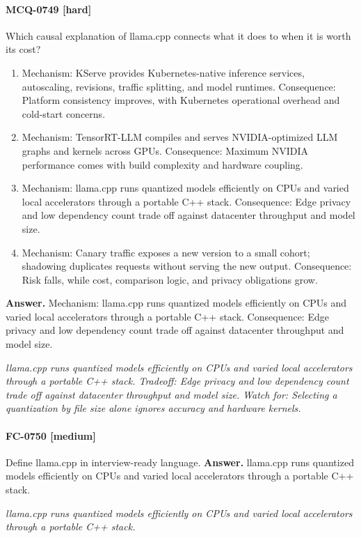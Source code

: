 \paragraph{MCQ-0749 [hard]} Which causal explanation of llama.cpp connects what it does to when it is worth its cost?
\begin{enumerate}[label=\Alph*.]
\item Mechanism: KServe provides Kubernetes-native inference services, autoscaling, revisions, traffic splitting, and model runtimes. Consequence: Platform consistency improves, with Kubernetes operational overhead and cold-start concerns.
\item Mechanism: TensorRT-LLM compiles and serves NVIDIA-optimized LLM graphs and kernels across GPUs. Consequence: Maximum NVIDIA performance comes with build complexity and hardware coupling.
\item Mechanism: llama.cpp runs quantized models efficiently on CPUs and varied local accelerators through a portable C++ stack. Consequence: Edge privacy and low dependency count trade off against datacenter throughput and model size.
\item Mechanism: Canary traffic exposes a new version to a small cohort; shadowing duplicates requests without serving the new output. Consequence: Risk falls, while cost, comparison logic, and privacy obligations grow.
\end{enumerate}
\noindent\textbf{Answer.} Mechanism: llama.cpp runs quantized models efficiently on CPUs and varied local accelerators through a portable C++ stack. Consequence: Edge privacy and low dependency count trade off against datacenter throughput and model size.
\par\textit{llama.cpp runs quantized models efficiently on CPUs and varied local accelerators through a portable C++ stack. Tradeoff: Edge privacy and low dependency count trade off against datacenter throughput and model size. Watch for: Selecting a quantization by file size alone ignores accuracy and hardware kernels.}
\paragraph{FC-0750 [medium]} Define llama.cpp in interview-ready language.
\noindent\textbf{Answer.} llama.cpp runs quantized models efficiently on CPUs and varied local accelerators through a portable C++ stack.
\par\textit{llama.cpp runs quantized models efficiently on CPUs and varied local accelerators through a portable C++ stack.}
